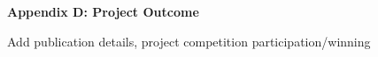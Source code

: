 
\vspace*{5cm}
\begin{centering}
    \large
{\LARGE\bf Appendix D: Project Outcome}\\
\end{centering}

\newpage

Add publication details, project competition participation/winning